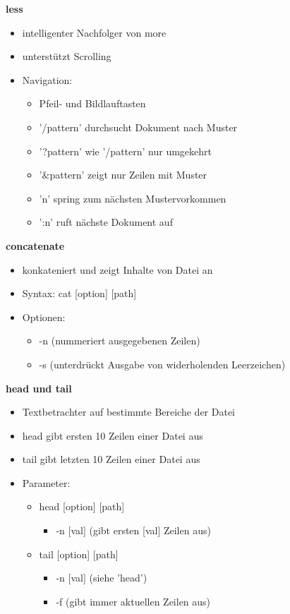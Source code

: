 \documentclass{article}
\begin{document}
\textbf{less}
\begin{itemize}
	\item intelligenter Nachfolger von more
	\item unterstützt Scrolling
	\item Navigation:
	\begin{itemize}
		\item Pfeil- und Bildlauftasten
		\item '/pattern' durchsucht Dokument nach Muster
		\item '?pattern' wie '/pattern' nur umgekehrt
		\item '$\&$pattern' zeigt nur Zeilen mit Muster
		\item 'n' spring zum nächsten Mustervorkommen
		\item ':n' ruft nächste Dokument auf
	\end{itemize}
\end{itemize}

\textbf{concatenate}
\begin{itemize}
	\item konkateniert und zeigt Inhalte von Datei an
	\item Syntax: cat [option] [path]
	\item Optionen:
	\begin{itemize}
		\item -n (nummeriert ausgegebenen Zeilen)
		\item -s (unterdrückt Ausgabe von widerholenden Leerzeichen)
	\end{itemize}
\end{itemize}

\textbf{head und tail}
\begin{itemize}
	\item Textbetrachter auf bestimmte Bereiche der Datei
	\item head gibt ersten 10 Zeilen einer Datei aus
	\item tail gibt letzten 10 Zeilen einer Datei aus
	\item Parameter:	
	\begin{itemize}
		\item head [option] [path]
		\begin{itemize}
			\item -n [val] (gibt ersten [val] Zeilen aus)
		\end{itemize}
		\item tail [option] [path]
		\begin{itemize}
			\item -n [val] (siehe 'head')
			\item -f (gibt immer aktuellen Zeilen aus)
		\end{itemize}
	\end{itemize}
\end{itemize}
\end{document}
